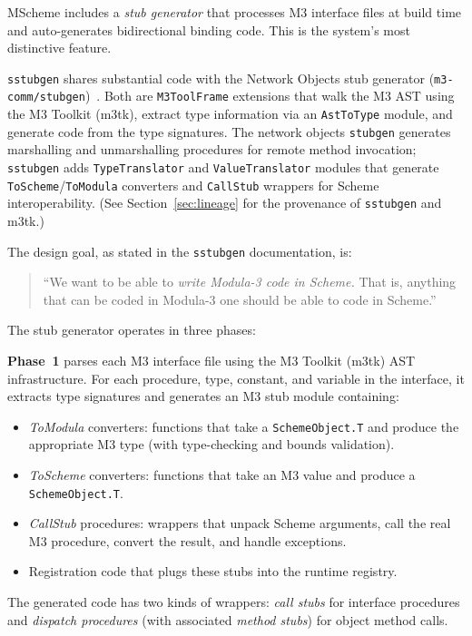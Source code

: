 \documentclass[11pt]{article}
\begin{document}
MScheme includes a \emph{stub generator} that processes M3 interface
files at build time and auto-generates bidirectional binding code.
This is the system's most distinctive feature.

\texttt{sstubgen} shares substantial code with the Network Objects
stub generator (\texttt{m3-comm/stubgen})~\cite{birrell1994}.  Both
are \texttt{M3ToolFrame} extensions that walk the M3 AST using the M3
Toolkit (m3tk), extract type information via an \texttt{AstToType}
module, and generate code from the type signatures.  The network
objects \texttt{stubgen} generates marshalling and unmarshalling
procedures for remote method invocation; \texttt{sstubgen} adds
\texttt{TypeTranslator} and \texttt{ValueTranslator} modules that
generate \texttt{ToScheme}/\texttt{ToModula} converters and
\texttt{CallStub} wrappers for Scheme interoperability.  (See
Section~\ref{sec:lineage} for the provenance of \texttt{sstubgen} and
m3tk.)

The design goal, as stated in the \texttt{sstubgen} documentation, is:

\begin{quote}
``We want to be able to \emph{write Modula-3 code in Scheme.}  That
is, anything that can be coded in Modula-3 one should be able to code
in Scheme.''
\end{quote}

The stub generator operates in three phases:

\textbf{Phase~1} parses each M3 interface file using the M3 Toolkit
(m3tk) AST infrastructure.  For each procedure, type, constant, and
variable in the interface, it extracts type signatures and generates
an M3 stub module containing:

\begin{itemize}
\item \emph{ToModula} converters: functions that take a
  \texttt{SchemeObject.T} and produce the appropriate M3 type (with
  type-checking and bounds validation).
\item \emph{ToScheme} converters: functions that take an M3 value and
  produce a \texttt{SchemeObject.T}.
\item \emph{CallStub} procedures: wrappers that unpack Scheme
  arguments, call the real M3 procedure, convert the result, and
  handle exceptions.
\item Registration code that plugs these stubs into the runtime
  registry.
\end{itemize}

The generated code has two kinds of wrappers: \emph{call stubs} for
interface procedures and \emph{dispatch procedures} (with associated
\emph{method stubs}) for object method calls.
\end{document}
